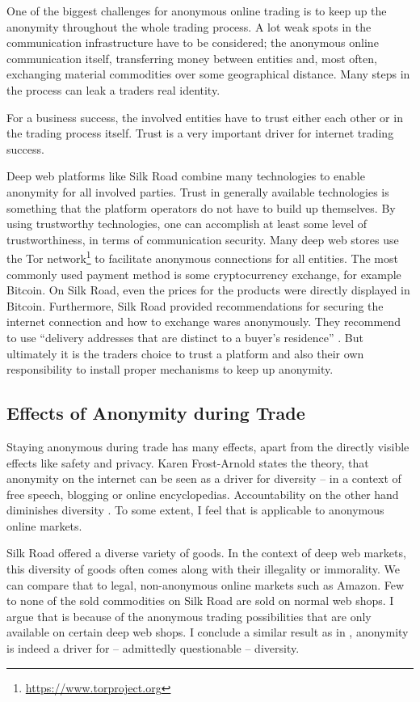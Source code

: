 One of the biggest challenges for anonymous online trading is to keep up the anonymity throughout the whole trading process. A lot weak spots in the communication infrastructure have to be considered; the anonymous online communication itself, transferring money between entities and, most often, exchanging material commodities over some geographical distance. Many steps in the process can leak a traders real identity.

For a business success, the involved entities have to trust either each other or in the trading process itself. Trust is a very important driver for internet trading success\cite{internetTrust2004}.

Deep web platforms like Silk Road\cite{silkroad2013} combine many technologies to enable anonymity for all involved parties. Trust in generally available technologies is something that the platform operators do not have to build up themselves. By using trustworthy technologies, one can accomplish at least some level of trustworthiness, in terms of communication security. Many deep web stores use the Tor network\footnote{\url{https://www.torproject.org}} to facilitate anonymous connections for all entities\cite{silkroad2013}. The most commonly used payment method is some cryptocurrency exchange, for example Bitcoin. On Silk Road, even the prices for the products were directly displayed in Bitcoin. Furthermore, Silk Road provided recommendations for securing the internet connection and how to exchange wares anonymously. They recommend to use ``delivery addresses that are distinct to a buyer's residence'' \cite{silkroad2013}. But ultimately it is the traders choice to trust a platform and also their own responsibility to install proper mechanisms to keep up anonymity.

\subsection{Effects of Anonymity during Trade}

Staying anonymous during trade has many effects, apart from the directly visible effects like safety and privacy. Karen Frost-Arnold \cite{accountability2014} states the theory, that anonymity on the internet can be seen as a driver for diversity -- in a context of free speech, blogging or online encyclopedias. Accountability on the other hand diminishes diversity \cite{accountability2014}. To some extent, I feel that is applicable to anonymous online markets.

Silk Road offered a diverse variety of goods. In the context of deep web markets, this diversity of goods often comes along with their illegality or immorality\cite{silkroad2013}. We can compare that to legal, non-anonymous online markets such as Amazon. Few to none of the sold commodities on Silk Road are sold on normal web shops. I argue that is because of the anonymous trading possibilities that are only available on certain deep web shops. I conclude a similar result as in \cite{accountability2014}, anonymity is indeed a driver for -- admittedly questionable -- diversity. 


